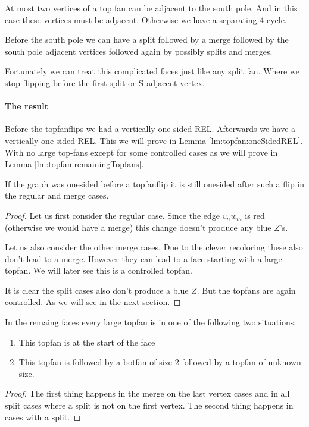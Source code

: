 At most two vertices of a top fan can be adjacent to the south pole. And in this case these vertices must be adjacent. Otherwise we have a separating 4-cycle.

Before the south pole we can have a split followed by a merge followed by the south pole adjacent vertices followed again by possibly splits and merges.

Fortunately we can treat this complicated faces just like any split fan. Where we stop flipping before the first split or $\mathrm{S}$-adjacent vertex.

\paragraph{The result}
Before the topfanflips we had a vertically one-sided REL. Afterwards we have a vertically one-sided REL. This we will prove in Lemma \ref{lm:topfan:oneSidedREL}. With no large top-fans except for some controlled cases as we will prove in Lemma \ref{lm:topfan:remainingTopfans}.

\begin{lemma}
  \label{lm:topfan:oneSidedREL}
  If the graph was onesided before a topfanflip it is still onesided after such a flip in the regular and merge cases.
\end{lemma}
\begin{proof}
  Let us first consider the regular case. Since the edge  $v_n w_m$ is red (otherwise we would have a merge) this change doesn't produce any blue $Z$'s.

  Let us also consider the other merge cases. Due to the   clever recoloring these also don't lead to a merge. However they can lead to a face starting with a large topfan. We will later see this is a controlled topfan.

  It is clear the split cases also don't produce a blue $Z$. But the topfans are again controlled. As we will see in the next section.
\end{proof}


\begin{lemma}
  \label{lm:topfan:remainingTopfans}
  In the remaing faces every large topfan is in one of the following two situations.
  \begin{enumerate}
    \item  This topfan is at the start of the face
    \item  This topfan is followed by a botfan of size 2 followed by a topfan of unknown size.
  \end{enumerate}
\end{lemma}
\begin{proof}
  The first thing happens in the merge on the last vertex cases and in all split cases where a split is not on the first vertex. The second thing happens in cases with a split.
\end{proof}
